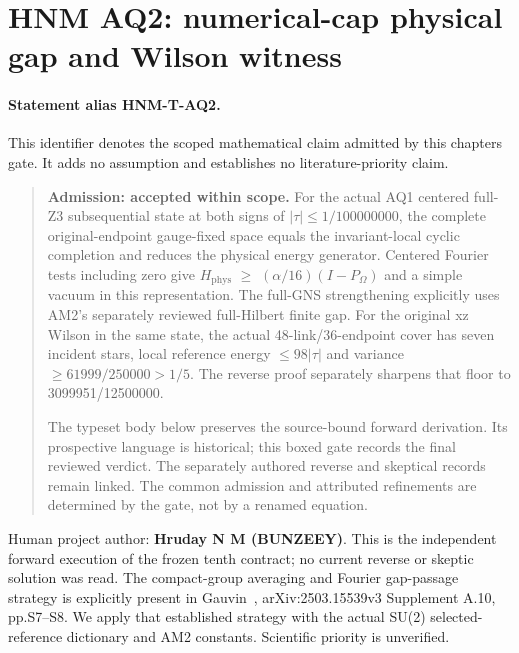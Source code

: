 \hypertarget{r29-aq2-aq2-forward-hnm-numerical-cap-physical-gap-and-wilson-witness}{%
\section{HNM AQ2: numerical-cap physical gap and Wilson witness\workstar}\label{r29:aq2:r29-aq2-aq2-forward-hnm-numerical-cap-physical-gap-and-wilson-witness}}
\paragraph{Statement alias HNM-T-AQ2.}\label{stmt:AQ2} This identifier denotes the scoped mathematical claim admitted by this chapter\textquotesingle s gate. It adds no assumption and establishes no literature-priority claim.

\begin{quote}\small \textbf{Admission: accepted within scope.} For the actual AQ1 centered full-Z3 subsequential state at both signs of \(|\tau|\le 1/100000000\), the complete original-endpoint gauge-fixed space equals the invariant-local cyclic completion and reduces the physical energy generator. Centered Fourier tests including zero give \(H_{\mathrm{phys}}\) \(\ge \) \((\alpha/16)(I-P_\Omega)\) and a simple vacuum in this representation. The full-GNS strengthening explicitly uses AM2's separately reviewed full-Hilbert finite gap. For the original xz Wilson in the same state, the actual 48-link/36-endpoint cover has seven incident stars, local reference energy \(\le 98|\tau|\) and variance \(\ge 61999/250000>1/5\). The reverse proof separately sharpens that floor to 3099951/12500000.\par The typeset body below preserves the source-bound forward derivation. Its prospective language is historical; this boxed gate records the final reviewed verdict. The separately authored reverse and skeptical records remain linked. The common admission and attributed refinements are determined by the gate, not by a renamed equation.\end{quote}
Human project author: \textbf{Hruday N M (BUNZEEY)}. This is the independent forward execution of the frozen tenth contract; no current reverse or skeptic solution was read. The compact-group averaging and Fourier gap-passage strategy is explicitly present in Gauvin~\citep{gauvin2026}, arXiv:2503.15539v3 Supplement A.10, pp.S7--S8. We apply that established strategy with the actual SU(2) selected-reference dictionary and AM2 constants. Scientific priority is unverified.

